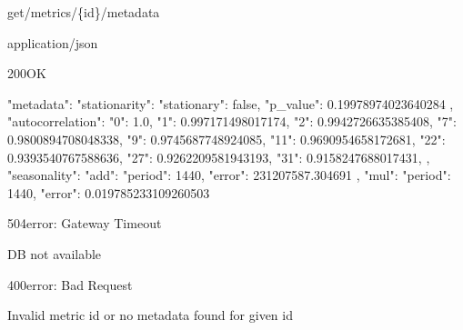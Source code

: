    \begin{apiRoute}{get}{/metrics/\{id\}/metadata}{}
    	
    	\begin{routeParameter}
    	\end{routeParameter}
    	\begin{routeResponse}{application/json}
    		\begin{routeResponseItem}{200}{OK}
    			\begin{routeResponseItemBody}
{
    "metadata": {
        "stationarity": {
            "stationary": false,
            "p_value": 0.19978974023640284
        },
        "autocorrelation": {
            "0": 1.0,
            "1": 0.997171498017174,
            "2": 0.9942726635385408,
            "7": 0.9800894708048338,
            "9": 0.9745687748924085,
            "11": 0.9690954658172681,
            "22": 0.9393540767588636,
            "27": 0.9262209581943193,
            "31": 0.9158247688017431,
        },
        "seasonality": {
            "add": {
                "period": 1440,
                "error": 231207587.304691
            },
            "mul": {
                "period": 1440,
                "error": 0.019785233109260503
            }
        }
    }
}
    			\end{routeResponseItemBody}
    		\end{routeResponseItem}
                \begin{routeResponseItem}{504}{error: Gateway Timeout}
    			\begin{routeResponseItemBody}
DB not available
    			\end{routeResponseItemBody}
    		\end{routeResponseItem}
    		\begin{routeResponseItem}{400}{error: Bad Request}
    			\begin{routeResponseItemBody}
Invalid metric id or no metadata found for given id
    			\end{routeResponseItemBody}
    		\end{routeResponseItem}
    	\end{routeResponse}
    	
    \end{apiRoute}

